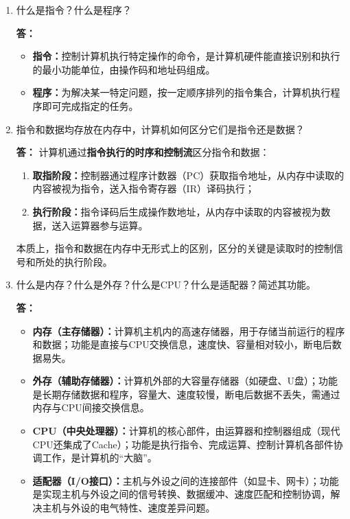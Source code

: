 \documentclass{article}
\begin{document}
\begin{enumerate}[label=\arabic*.]
    \item 什么是指令？什么是程序？
    
    \textbf{答：}
    \begin{itemize}
        \item \textbf{指令：}控制计算机执行特定操作的命令，是计算机硬件能直接识别和执行的最小功能单位，由操作码和地址码组成。
        \item \textbf{程序：}为解决某一特定问题，按一定顺序排列的指令集合，计算机执行程序即可完成指定的任务。
    \end{itemize}

    \item 指令和数据均存放在内存中，计算机如何区分它们是指令还是数据？
    
    \textbf{答：}
    计算机通过\textbf{指令执行的时序和控制流}区分指令和数据：
    \begin{enumerate}
        \item \textbf{取指阶段：}控制器通过程序计数器（PC）获取指令地址，从内存中读取的内容被视为指令，送入指令寄存器（IR）译码执行；
        \item \textbf{执行阶段：}指令译码后生成操作数地址，从内存中读取的内容被视为数据，送入运算器参与运算。
    \end{enumerate}
    本质上，指令和数据在内存中无形式上的区别，区分的关键是读取时的控制信号和所处的执行阶段。

    \item 什么是内存？什么是外存？什么是CPU？什么是适配器？简述其功能。
    
    \textbf{答：}
    \begin{itemize}
        \item \textbf{内存（主存储器）：}计算机主机内的高速存储器，用于存储当前运行的程序和数据；功能是直接与CPU交换信息，速度快、容量相对较小，断电后数据易失。
        \item \textbf{外存（辅助存储器）：}计算机外部的大容量存储器（如硬盘、U盘）；功能是长期存储数据和程序，容量大、速度较慢，断电后数据不丢失，需通过内存与CPU间接交换信息。
        \item \textbf{CPU（中央处理器）：}计算机的核心部件，由运算器和控制器组成（现代CPU还集成了Cache）；功能是执行指令、完成运算、控制计算机各部件协调工作，是计算机的“大脑”。
        \item \textbf{适配器（I/O接口）：}主机与外设之间的连接部件（如显卡、网卡）；功能是实现主机与外设之间的信号转换、数据缓冲、速度匹配和控制协调，解决主机与外设的电气特性、速度差异问题。
    \end{itemize}


\end{enumerate}
\end{document}

